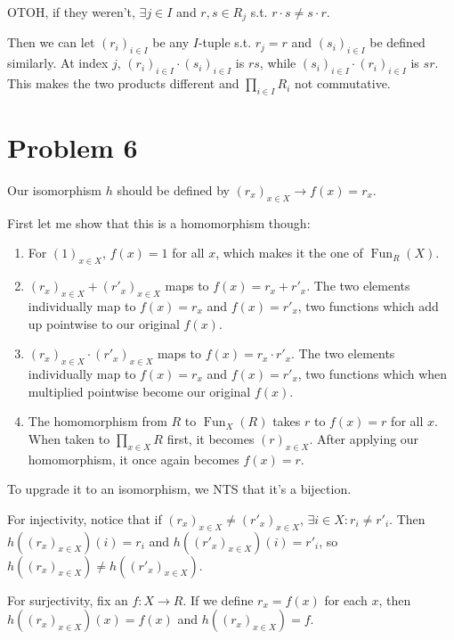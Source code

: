 \documentclass[12pt]{article}
\DeclareMathOperator{\Fun}{Fun}
\begin{document}
OTOH, if they weren't, $\exists j \in I$ and $r, s \in R_j$ s.t. $r \cdot s \ne s \cdot r$.

Then we can let $(r_i)_{i \in I}$ be any $I$-tuple s.t. $r_j=r$ and $(s_i)_{i \in I}$ be defined similarly.
At index $j$, $(r_i)_{i \in I} \cdot (s_i)_{i \in I}$ is $rs$, while
$(s_i)_{i \in I} \cdot (r_i)_{i \in I}$ is $sr$.
This makes the two products different and $\prod_{i \in I} R_i$ not commutative.

\section{Problem 6}

Our isomorphism $h$ should be defined by $(r_x)_{x \in X} \to f(x)=r_x$.

First let me show that this is a homomorphism though:
\begin{enumerate}
  \item For $(1)_{x \in X}$, $f(x)=1$ for all $x$, which makes it the one of $\Fun_R(X)$.

  \item $(r_x)_{x \in X}+(r'_x)_{x \in X}$ maps to $f(x)=r_x+r'_x$.
        The two elements individually map to $f(x)=r_x$ and $f(x)=r'_x$,
        two functions which add up pointwise to our original $f(x)$.

  \item $(r_x)_{x \in X} \cdot (r'_x)_{x \in X}$ maps to $f(x)=r_x \cdot r'_x$.
        The two elements individually map to $f(x)=r_x$ and $f(x)=r'_x$,
        two functions which when multiplied pointwise become our original $f(x)$.

  \item The homomorphism from $R$ to $\Fun_X(R)$ takes $r$ to $f(x)=r$ for all $x$.
        When taken to $\prod_{x \in X} R$ first, it becomes $(r)_{x \in X}$.
        After applying our homomorphism, it once again becomes $f(x)=r$.
\end{enumerate}

To upgrade it to an isomorphism, we NTS that it's a bijection.

For injectivity, notice that if $(r_x)_{x \in X} \ne (r'_x)_{x \in X}$,
$\exists i \in X: r_i \ne r'_i$.
Then $h((r_x)_{x \in X})(i)=r_i$ and $h((r'_x)_{x \in X})(i)=r'_i$,
so $h((r_x)_{x \in X}) \ne h((r'_x)_{x \in X})$.

For surjectivity, fix an $f: X \to R$.
If we define $r_x=f(x)$ for each $x$, then $h((r_x)_{x \in X})(x)=f(x)$ and $h((r_x)_{x \in X})=f$.
\end{document}
